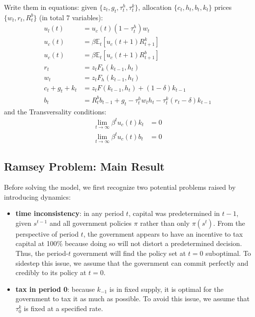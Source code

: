 \documentclass[12pt]{article}
\newcommand{\E}{\mathbb{E}}
\begin{document}
	\noindent
	Write them in equations: given $\{z_t, g_t, \tau_t^h, \tau_t^k\}$, allocation $\{c_t, h_t, b_t, k_t\}$ prices $\{w_t, r_t, R_t^b\}$ (in total 7 variables):
	\begin{align}
		u_l(t) &= u_c(t) (1-\tau_t^h) w_t \label{eq:intra}\\
		u_c(t) &= \beta \E_t[u_c(t+1)R_{t+1}^k] \label{eq:euler_k}\\
		u_c(t) &= \beta \E_t[u_c(t+1)R_{t+1}^b] \label{eq:euler_b}\\
		r_t &= z_t F_k(k_{t-1}, h_t) \label{eq:foc_k}\\
		w_t &= z_t F_h(k_{t-1}, h_t) \label{eq:foc_h}\\
		c_t + g_t + k_t &= z_tF(k_{t-1}, h_t) + (1-\delta)k_{t-1} \label{eq:goods_clearing}\\
		b_t &= R_{t}^b b_{t-1} + g_t - \tau_t^h w_th_t - \tau_t^k (r_t - \delta)k_{t-1} \label{eq:bonds_clearing}
	\end{align}
	and the Transversality conditions:
	\begin{align*}
		\lim_{t\rightarrow \infty} \beta^t u_c(t)k_t &= 0\\
		\lim_{t\rightarrow \infty} \beta^t u_c(t)b_t &= 0
	\end{align*}
	
	\subsection{Ramsey Problem: Main Result}
		Before solving the model, we first recognize two potential problems raised by introducing dynamics:
	\begin{itemize}
			\item \textbf{time inconsistency}: in any period $t$, capital was predetermined in $t-1$, given $s^{t-1}$ and all government policies $\pi$ rather than only $\pi(s^t)$. From the perspective of period $t$, the government appears to have an incentive to tax capital at 100\% because doing so will not distort a predetermined decision. Thus, the period-$t$ government will find the policy set at $t=0$ suboptimal. To sidestep this issue, we assume that the government can commit perfectly and credibly to its policy at $t=0$.
			\item \textbf{tax in period 0}: because $k_{-1}$ is in fixed supply, it is optimal for the government to tax it as much as possible. To avoid this issue, we assume that $\tau_0^k$ is fixed at a specified rate.
	\end{itemize}
	
\end{document}
